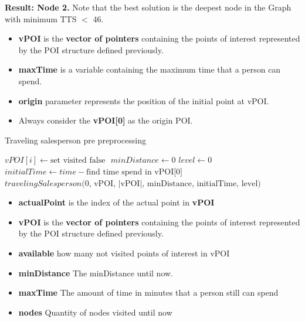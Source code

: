 \documentclass{article}
\begin{document}
\textbf{Result: Node 2.} \newline
Note that the best solution is the deepest node in the Graph with minimum TTS $<$ 46. 

\begin{itemize}
    
    \item \textbf{vPOI} is the \textbf{vector of pointers} containing the points of interest represented by the POI structure defined previously.
    \item \textbf{maxTime} is a variable containing the maximum time that a person can spend.
    \item \textbf{origin} parameter represents the position of the initial point at vPOI. 
    \item Always consider the \textbf{vPOI[0]} as the origin POI. 
\end{itemize}


    \begin{algorithm}[h]
    \caption{Traveling salesperson pre preprocessing}
    \begin{algorithmic}[1]
    
    
            \State $vPOI[i] \gets \text{set visited false}$
        \EndFor
        \State $ $
        \State $minDistance \gets 0$
        \State $level \gets 0$
        \State $initialTime \gets time - \text{find time spend in vPOI[0]}$
        \State $ $
        \State $ $
        \Return $travelingSalesperson\text{(0, vPOI, $|$vPOI$|$, minDistance, initialTime, level)}$
    \EndProcedure
    \end{algorithmic}
\end{algorithm}
    \begin{itemize}
    \item \textbf{actualPoint} is the index of the actual point in \textbf{vPOI}
    \item \textbf{vPOI} is the \textbf{vector of pointers} containing the points of interest represented by the POI structure defined previously.
    \item \textbf{available} how many not visited points of interest in vPOI
    \item \textbf{minDistance} The minDistance until now. 
    \item \textbf{maxTime} The amount of time in minutes that a person still can spend
    \item \textbf{nodes} Quantity of nodes visited until now  
\end{itemize}
    
\end{document}
